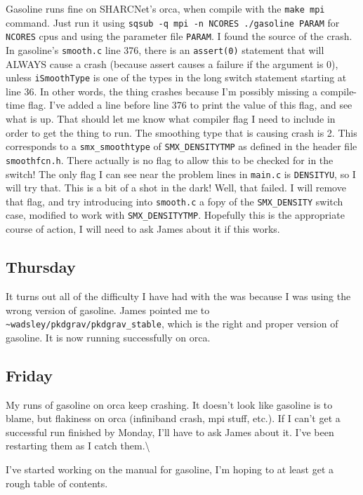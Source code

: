 \documentclass[11pt,letterpaper]{article}
\begin{document}
Gasoline runs fine on SHARCNet's orca, when compile with the
\verb!make mpi! command. Just run it using
\verb!sqsub -q mpi -n NCORES ./gasoline PARAM! for \verb!NCORES! cpus
and using the parameter file \verb!PARAM!. I found the source of the
crash. In gasoline's \verb!smooth.c! line 376, there is an
\verb!assert(0)! statement that will ALWAYS cause a crash (because
assert causes a failure if the argument is 0), unless \verb!iSmoothType!
is one of the types in the long switch statement starting at line 36. In
other words, the thing crashes because I'm possibly missing a
compile-time flag. I've added a line before line 376 to print the value
of this flag, and see what is up. That should let me know what compiler
flag I need to include in order to get the thing to run. The smoothing
type that is causing crash is 2. This corresponds to a
\verb!smx_smoothtype! of \verb!SMX_DENSITYTMP! as defined in the header
file \verb!smoothfcn.h!. There actually is no flag to allow this to be
checked for in the switch! The only flag I can see near the problem
lines in \verb!main.c! is \verb!DENSITYU!, so I will try that. This is a
bit of a shot in the dark! Well, that failed. I will remove that flag,
and try introducing into \verb!smooth.c! a fopy of the
\verb!SMX_DENSITY! switch case, modified to work with
\verb!SMX_DENSITYTMP!. Hopefully this is the appropriate course of
action, I will need to ask James about it if this works.

\subsection{Thursday}

It turns out all of the difficulty I have had with the was because I was
using the wrong version of gasoline. James pointed me to
\verb!~wadsley/pkdgrav/pkdgrav_stable!, which is the right and proper
version of gasoline. It is now running successfully on orca.

\subsection{Friday}

My runs of gasoline on orca keep crashing. It doesn't look like gasoline
is to blame, but flakiness on orca (infiniband crash, mpi stuff, etc.).
If I can't get a successful run finished by Monday, I'll have to ask
James about it. I've been restarting them as I catch
them.\textbackslash{}

I've started working on the manual for gasoline, I'm hoping to at least
get a rough table of contents.
\end{document}
